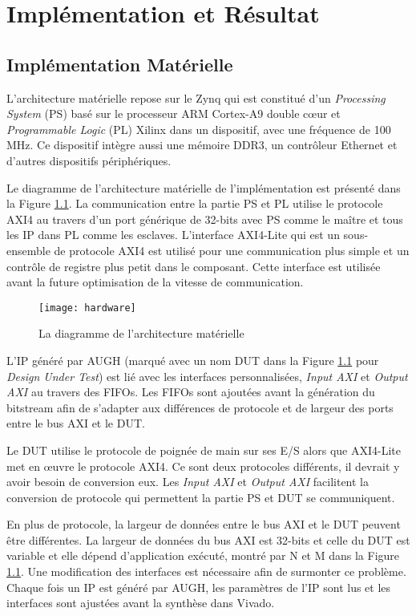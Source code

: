 \chapter{Implémentation et Résultat}

\section{Implémentation Matérielle}

L'architecture matérielle repose sur le Zynq qui est constitué d'un \emph{Processing System} (PS) 
basé sur le processeur ARM Cortex-A9 double cœur et \emph{Programmable Logic} (PL) Xilinx dans
un dispositif, avec une fréquence de 100 MHz. Ce dispositif intègre aussi une mémoire DDR3,
un contrôleur Ethernet et d'autres dispositifs périphériques.

Le diagramme de l'architecture matérielle de l'implémentation est présenté dans la Figure \ref{fig:hard}.
La communication entre la partie PS et PL utilise le protocole AXI4 au travers d'un port générique
de 32-bits avec PS comme le maître et tous les IP dans PL comme les esclaves.
L'interface AXI4-Lite qui est un sous-ensemble de protocole AXI4 est utilisé pour une communication
plus simple et un contrôle de registre plus petit dans le composant. Cette interface est utilisée
avant la future optimisation de la vitesse de communication.

\begin{figure}[h]
	\label{fig:hard}
	\centering
	\texttt{[image: hardware]}
	\caption{La diagramme de l'architecture matérielle}
	\vspace{-2mm}
\end{figure}

L'IP généré par AUGH (marqué avec un nom DUT dans la Figure \ref{fig:hard} pour \emph{Design Under Test}) est lié avec les interfaces personnalisées,
\emph{Input AXI} et \emph{Output AXI} au travers des FIFOs. Les FIFOs sont ajoutées avant la génération du bitstream
afin de s'adapter aux différences de protocole et de largeur des ports entre le bus AXI et le DUT.

Le DUT utilise le protocole de poignée de main sur ses E/S alors que AXI4-Lite met en œuvre le protocole AXI4.
Ce sont deux protocoles différents, il devrait y avoir besoin de conversion eux. Les \emph{Input AXI} et \emph{Output AXI}
facilitent la conversion de protocole qui permettent la partie PS et DUT se communiquent. 

En plus de protocole, la largeur de données entre le bus AXI et le DUT peuvent être différentes.
La largeur de données du bus AXI est 32-bits et celle du DUT est variable et elle dépend d'application
exécuté, montré par N et M dans la Figure \ref{fig:hard}. Une modification des interfaces est nécessaire afin
de surmonter ce problème. Chaque fois un IP est généré par AUGH, les paramètres de l'IP sont
lus et les interfaces sont ajustées avant la synthèse dans Vivado. 

